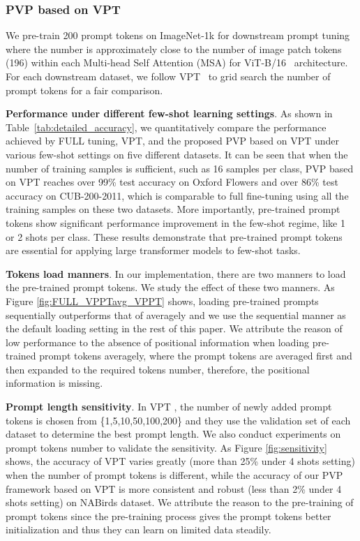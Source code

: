 \documentclass[10pt,journal,letterpaper,compsoc]{IEEEtran}
\begin{document}
\subsubsection{PVP based on VPT}
 We pre-train 200 prompt tokens on ImageNet-1k for downstream prompt tuning where the number is approximately close to the number of image
patch tokens (196) within each Multi-head Self Attention (MSA) for ViT-B/16~\cite{vit} architecture. For each downstream dataset, we follow VPT~\cite{vpt} to grid search the number of prompt tokens for a fair comparison. 

\textbf{Performance under different few-shot learning settings}. As shown in Table~\ref{tab:detailed_accuracy}, we quantitatively compare the performance achieved by FULL tuning, VPT, and the proposed PVP based on VPT under various few-shot settings on five different datasets. It can be seen that when the number of training samples is sufficient, such as 16 samples per class, PVP based on VPT reaches over 99\% test accuracy on Oxford Flowers and over 86\% test accuracy on CUB-200-2011, which is comparable to full fine-tuning using all the training samples on these two datasets. More importantly, pre-trained prompt tokens show significant performance improvement in the few-shot regime, like 1 or 2 shots per class. These results demonstrate that pre-trained prompt tokens are essential for applying large transformer models to few-shot tasks.

\textbf{Tokens load manners}. In our implementation, there are two manners to load the pre-trained prompt tokens. We study the effect of these two manners. As Figure \ref{fig:FULL_VPPTavg_VPPT} shows, loading pre-trained prompts sequentially outperforms that of averagely and we use the sequential manner as the default loading setting in the rest of this paper. We attribute the reason of low performance to the absence of positional information when loading pre-trained prompt tokens averagely, where the prompt tokens are averaged first and then expanded to the required tokens number, therefore, the positional information is missing.

\textbf{Prompt length sensitivity}. In VPT \cite{vpt}, the number of newly added prompt tokens is chosen from \{1,5,10,50,100,200\} and they use the validation set of each dataset to determine the best prompt length. We also conduct experiments on prompt tokens number to validate the sensitivity. As Figure \ref{fig:sensitivity} shows, the accuracy of VPT varies greatly (more than 25\% under 4 shots setting) when the number of prompt tokens is different, while the accuracy of our PVP framework based on VPT is more consistent and robust (less than 2\% under 4 shots setting) on NABirds dataset. We attribute the reason to the pre-training of prompt tokens since the pre-training process gives the prompt tokens better initialization and thus they can learn on limited data steadily.
\end{document}
